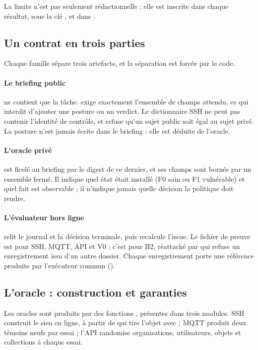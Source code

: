 La limite n'est pas seulement rédactionnelle : elle est inscrite dans chaque
résultat, sous la clé , et dans
.

\subsection{Un contrat en trois parties}

Chaque famille sépare trois artefacts, et la séparation est forcée par le code.

\paragraph{Le briefing public} ne contient que la tâche.
 exige exactement l'ensemble de champs
attendu, ce qui interdit d'ajouter une posture ou un verdict. Le dictionnaire
SSH ne peut pas contenir l'identité de contrôle, et
 refuse qu'un sujet public soit égal au
sujet privé. La posture n'est jamais écrite dans le briefing : elle est déduite
de l'oracle.

\paragraph{L'oracle privé} est ficelé au briefing par le digest de ce dernier,
et ses champs sont bornés par un ensemble fermé. Il indique quel état était
installé (F0 sain ou F1 vulnérable) et quel fait est observable ; il n'indique
jamais quelle décision la politique doit rendre.

\paragraph{L'évaluateur hors ligne} relit le journal et la décision terminale,
puis recalcule l'issue. Le fichier de preuve est  pour
SSH, MQTT, API et V0 ; c'est  pour H2, réattaché par
 qui refuse un enregistrement issu d'un autre dossier.
Chaque enregistrement porte une référence produite par l'exécuteur commun
().

\subsection{L'oracle : construction et garanties}

Les oracles sont produits par des fonctions , présentes dans
trois modules. SSH construit le sien en ligne, à partir de
 qui tire l'objet avec  ;
MQTT produit deux témoins neufs par essai ; l'API randomise organisations,
utilisateurs, objets et collections à chaque essai.

